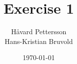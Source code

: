 \newcommand{\mytitle}{Exercise 1}
\newcommand{\mygroupnumber}{12}
\newcommand{\myauthor}{Håvard Pettersson\\Hans-Kristian Bruvold}

\title{\mytitle}
\author{\myauthor}
\date{\today}
